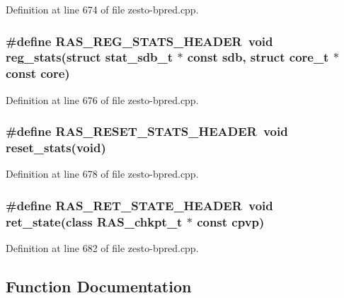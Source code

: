 Definition at line 674 of file zesto-bpred.cpp.
\subsubsection[{RAS\_\-REG\_\-STATS\_\-HEADER}]{\setlength{\rightskip}{0pt plus 5cm}\#define RAS\_\-REG\_\-STATS\_\-HEADER~void reg\_\-stats(struct {\bf stat\_\-sdb\_\-t} $\ast$ const sdb, struct {\bf core\_\-t} $\ast$ const core)}\label{zesto-bpred_8cpp_f3a70921a0155c979774deb51e60e80c}




Definition at line 676 of file zesto-bpred.cpp.
\subsubsection[{RAS\_\-RESET\_\-STATS\_\-HEADER}]{\setlength{\rightskip}{0pt plus 5cm}\#define RAS\_\-RESET\_\-STATS\_\-HEADER~void reset\_\-stats(void)}\label{zesto-bpred_8cpp_f6c37d10a4465128b97b7a770dd315ec}




Definition at line 678 of file zesto-bpred.cpp.
\subsubsection[{RAS\_\-RET\_\-STATE\_\-HEADER}]{\setlength{\rightskip}{0pt plus 5cm}\#define RAS\_\-RET\_\-STATE\_\-HEADER~void ret\_\-state(class {\bf RAS\_\-chkpt\_\-t} $\ast$ const cpvp)}\label{zesto-bpred_8cpp_90e6c65b6985037a10d94ff57eca989a}




Definition at line 682 of file zesto-bpred.cpp.

\subsection{Function Documentation}
